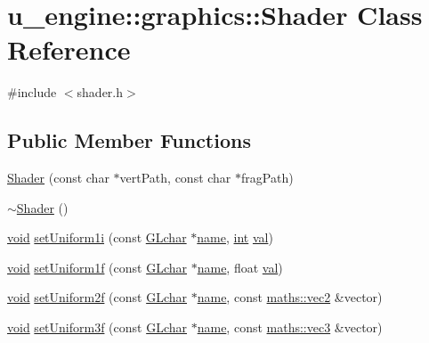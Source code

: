 \hypertarget{classu__engine_1_1graphics_1_1_shader}{}\section{u\+\_\+engine\+:\+:graphics\+:\+:Shader Class Reference}
\label{classu__engine_1_1graphics_1_1_shader}


{\ttfamily \#include $<$shader.\+h$>$}

\subsection*{Public Member Functions}
\begin{DoxyCompactItemize}
\item 
\hyperlink{classu__engine_1_1graphics_1_1_shader_a983b1025759d580f47499d4103321e1e}{Shader} (const char $\ast$vert\+Path, const char $\ast$frag\+Path)
\item 
\hyperlink{classu__engine_1_1graphics_1_1_shader_a8d08acdf9bb1b18cc980a8229838434a}{$\sim$\+Shader} ()
\item 
\hyperlink{wglew_8h_aeea6e3dfae3acf232096f57d2d57f084}{void} \hyperlink{classu__engine_1_1graphics_1_1_shader_a0427896de6509827a587bff443ffdade}{set\+Uniform1i} (const \hyperlink{glew_8h_af7575655ac056b187ea385966b95a22d}{G\+Lchar} $\ast$\hyperlink{glew_8h_a5c4947d4516dd7cfa3505ce3a648a4ef}{name}, \hyperlink{wglew_8h_a500a82aecba06f4550f6849b8099ca21}{int} \hyperlink{glew_8h_a26942fd2ed566ef553eae82d2c109c8f}{val})
\item 
\hyperlink{wglew_8h_aeea6e3dfae3acf232096f57d2d57f084}{void} \hyperlink{classu__engine_1_1graphics_1_1_shader_ac4f9160e334ff67a69918d978ddeba29}{set\+Uniform1f} (const \hyperlink{glew_8h_af7575655ac056b187ea385966b95a22d}{G\+Lchar} $\ast$\hyperlink{glew_8h_a5c4947d4516dd7cfa3505ce3a648a4ef}{name}, float \hyperlink{glew_8h_a26942fd2ed566ef553eae82d2c109c8f}{val})
\item 
\hyperlink{wglew_8h_aeea6e3dfae3acf232096f57d2d57f084}{void} \hyperlink{classu__engine_1_1graphics_1_1_shader_af7c3899c2f210b8f662d5077ffa07c3a}{set\+Uniform2f} (const \hyperlink{glew_8h_af7575655ac056b187ea385966b95a22d}{G\+Lchar} $\ast$\hyperlink{glew_8h_a5c4947d4516dd7cfa3505ce3a648a4ef}{name}, const \hyperlink{structu__engine_1_1maths_1_1vec2}{maths\+::vec2} \&vector)
\item 
\hyperlink{wglew_8h_aeea6e3dfae3acf232096f57d2d57f084}{void} \hyperlink{classu__engine_1_1graphics_1_1_shader_ae760e5ccae41bb68a71c7e849285fe6a}{set\+Uniform3f} (const \hyperlink{glew_8h_af7575655ac056b187ea385966b95a22d}{G\+Lchar} $\ast$\hyperlink{glew_8h_a5c4947d4516dd7cfa3505ce3a648a4ef}{name}, const \hyperlink{structu__engine_1_1maths_1_1vec3}{maths\+::vec3} \&vector)

\end{DoxyCompactItemize}

